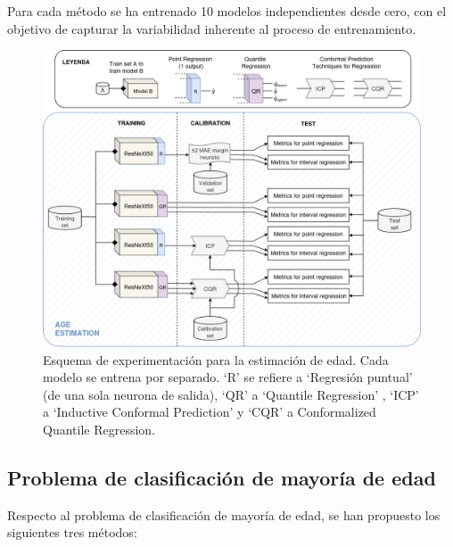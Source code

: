 Para cada método se ha entrenado 10 modelos independientes desde cero, con el objetivo de capturar la variabilidad inherente al proceso de entrenamiento.

\begin{figure}[h]
    \centering
    \includegraphics[angle=90, width=\textwidth]{capitulos/cap_05/imagenes/AE_experimental_pipeline.png}
    \caption[
        Esquema de experimentación para la estimación de edad.
    ]{
        Esquema de experimentación para la estimación de edad. Cada modelo se entrena por separado. `R' se refiere a `Regresión puntual' (de una sola neurona de salida), `QR' a `Quantile Regression' , `ICP' a `Inductive Conformal Prediction' y `CQR' a Conformalized Quantile Regression.
    } 
    \label{fig:AE_experimental_pipeline}
\end{figure}

\FloatBarrier


\subsection{Problema de clasificación de mayoría de edad}

Respecto al problema de clasificación de mayoría de edad, se han propuesto los siguientes tres métodos: 

